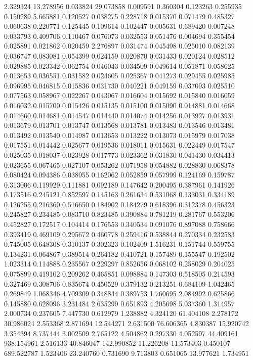 2.329324
13.278956
0.033824
29.073858
0.009591
0.360304
0.123263
0.255935
0.150289
5.665881
0.120527
0.038275
0.228718
0.015370
0.071479
0.485327
0.060638
0.220771
0.125445
0.109614
0.102447
0.005631
0.689420
0.007248
0.033793
0.409706
0.110467
0.076073
0.032553
0.051476
0.004694
0.355454
0.025891
0.021862
0.020459
2.276897
0.031474
0.045498
0.025010
0.082139
0.036747
0.083081
0.054399
0.024159
0.020870
0.031433
0.020124
0.028512
0.029885
0.023342
0.062754
0.046043
0.034509
0.049614
0.051871
0.058625
0.013653
0.036551
0.031582
0.024605
0.025367
0.041273
0.029455
0.025985
0.096995
0.046815
0.015836
0.031730
0.040221
0.049159
0.037093
0.025510
0.077563
0.058967
0.022267
0.043067
0.016604
0.015692
0.015840
0.016059
0.016032
0.015700
0.015426
0.015135
0.015100
0.015090
0.014881
0.014668
0.014660
0.014681
0.014547
0.014440
0.014074
0.014256
0.013927
0.013931
0.013679
0.013701
0.013747
0.013568
0.013781
0.013483
0.013546
0.013481
0.013492
0.013540
0.014987
0.013653
0.013222
0.013073
0.015979
0.017038
0.017551
0.014442
0.025677
0.019536
0.018011
0.015631
0.022449
0.017547
0.025035
0.018037
0.023928
0.017773
0.023362
0.031830
0.041430
0.034413
0.023655
0.067465
0.027107
0.053262
0.071958
0.054882
0.028830
0.068378
0.080424
0.094386
0.038955
0.162062
0.052859
0.057999
0.124169
0.159787
0.313006
0.119929
0.111881
0.092189
0.147642
0.200495
0.387961
0.141926
0.173516
0.245121
0.852597
0.145163
0.261634
0.531068
0.133031
0.334189
0.126255
0.216360
0.516650
0.184902
0.184279
0.618396
0.312378
0.456323
0.245827
0.234485
0.083710
0.823485
0.390884
0.781219
0.281767
0.553206
0.452827
0.172517
0.104414
0.176553
0.340534
0.091076
0.897088
0.758666
0.393419
0.469109
0.295672
0.460778
0.259416
0.538844
0.270334
0.232583
0.745005
0.648308
0.310137
0.302323
0.102409
1.516231
0.151744
0.559755
0.134231
0.064867
0.389514
0.264182
0.410721
0.157489
0.155547
0.192502
1.023314
0.114888
0.235567
0.229297
0.852656
0.068102
0.258029
0.204025
0.075899
0.419102
0.209262
0.465851
0.098884
0.147303
0.518505
0.214593
0.327469
0.308706
0.835674
0.450529
0.379132
0.213251
0.684109
1.042465
0.269849
1.068346
4.709309
0.348844
0.389753
1.760695
2.084992
0.625866
0.145880
0.628096
3.231484
2.635299
0.651893
4.205698
5.037360
1.314957
2.000734
0.237605
7.447730
0.612979
1.238882
4.324120
61.404108
2.278172
30.986024
2.553368
2.871694
12.544271
2.631500
76.606365
4.830387
15.920742
3.354394
8.737444
3.002509
2.765122
4.504862
0.297330
4.052597
44.409161
938.154961
2.516133
40.846047
142.990852
11.226208
11.573403
0.450107
689.522787
1.523406
23.240760
0.731690
9.713803
0.651065
13.977621
1.734951
